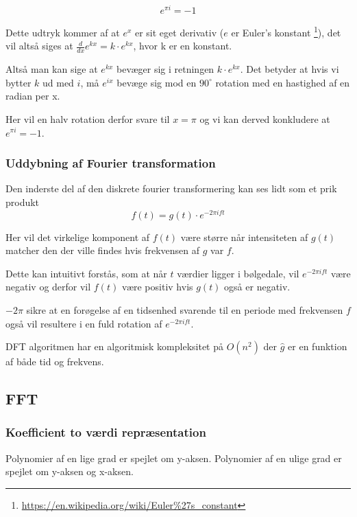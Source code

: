\documentclass[11pt,a4paper]{article}
\begin{document}
$$
e^{\pi i} = -1
$$

Dette udtryk kommer af at \(e^x\) er sit eget derivativ (\(e\) er Euler's konstant \footnote{\url{https://en.wikipedia.org/wiki/Euler\%27s\_constant}}),
det vil altså siges at \(\frac{d}{dx}e^{kx} = k\cdot e^{kx}\), hvor k er en konstant.

Altså man kan sige at \(e^{kx}\) bevæger sig i retningen \(k \cdot e^{kx}\).
Det betyder at hvis vi bytter \(k\) ud med \(i\), må \(e^{ix}\) bevæge sig mod en \(90^\circ\) rotation med en hastighed af en radian per x.

Her vil en halv rotation derfor svare til \(x=\pi\) og vi kan derved konkludere at \(e^{\pi i} = -1\).

\subsubsection{Uddybning af Fourier transformation}
\label{sec:orgd0d8b77}

Den inderste del af den diskrete fourier transformering kan ses lidt som et prik produkt
$$
f(t) = g(t) \cdot e ^{-2\pi ift}
$$

Her vil det virkelige komponent af \(f(t)\) være større når intensiteten af \(g(t)\)
matcher den der ville findes hvis frekvensen af \(g\) var \(f\).

Dette kan intuitivt forstås, som at når \(t\) værdier ligger i bølgedale, vil \(e^{-2\pi ift}\) være negativ
og derfor vil \(f(t)\) være positiv hvis \(g(t)\) også er negativ.

\(-2\pi\) sikre at en forøgelse af en tidsenhed svarende til en periode med frekvensen \(f\) også vil resultere
i en fuld rotation af \(e^{-2\pi ift}\).

\bigskip

DFT algoritmen har en algoritmisk kompleksitet på \(O(n^2)\) der \(\hat{g}\) er en funktion af både tid og frekvens.

\newpage

\subsection{FFT}
\label{sec:org2d2f572}

\subsubsection{Koefficient to værdi repræsentation}
\label{sec:org254e09e}

Polynomier af en lige grad er spejlet om y-aksen.
Polynomier af en ulige grad er spejlet om y-aksen og x-aksen.
\end{document}
